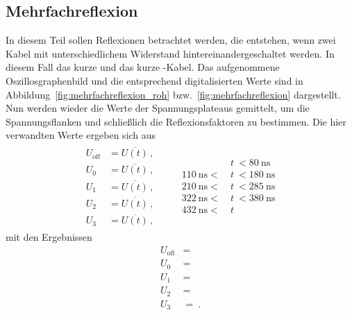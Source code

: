 
\subsection{Mehrfachreflexion}
\label{sub:mehrfachreflexion}

In diesem Teil sollen Reflexionen betrachtet werden, die entstehen, wenn zwei
Kabel mit unterschiedlichem Widerstand hintereinandergeschaltet werden.
In diesem Fall das kurze \CU und das kurze \BU-Kabel.
Das aufgenommene Oszillosgraphenbild und die entsprechend digitalisierten Werte
sind in Abbildung~\ref{fig:mehrfachreflexion_roh}
bzw.~\ref{fig:mehrfachreflexion} dargestellt.
Nun werden wieder die Werte der Spannungsplateaus gemittelt, um die
Spannungsflanken und schließlich die Reflexionsfaktoren zu bestimmen.
Die hier verwandten Werte ergeben sich aus
\begin{align*}
  \begin{aligned}
    U_\text{off} &= \overline{U(t)}\,, \\
    U_0          &= \overline{U(t)}\,, \\
    U_1          &= \overline{U(t)}\,, \\
    U_2          &= \overline{U(t)}\,, \\
    U_3          &= \overline{U(t)}\,,
  \end{aligned}
  \qquad
  \begin{aligned}
    &t~< \SI{80}{\nano\second} \\
    \SI{110}{\nano\second} <~&t~< \SI{180}{\nano\second} \\
    \SI{210}{\nano\second}  <~&t~< \SI{285}{\nano\second} \\
    \SI{322}{\nano\second} <~&t~< \SI{380}{\nano\second} \\
    \SI{432}{\nano\second} <~&t
  \end{aligned}
\end{align*}
mit den Ergebnissen
\begin{align*}
  U_\text{off} &=  \\
  U_0 &=  \\
  U_1 &=  \\
  U_2 &=  \\
  U_3 &= ~.
\end{align*}
